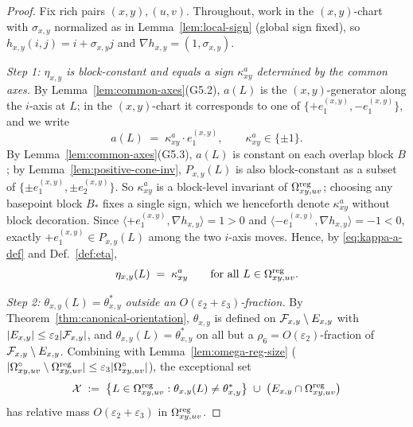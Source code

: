 \begin{proof}
Fix rich pairs $(x,y),(u,v)$. Throughout, work in the $(x,y)$-chart
with $\sigma_{x,y}$ normalized as in Lemma~\ref{lem:local-sign} (global
sign fixed), so $h_{x,y}(i,j)=i+\sigma_{x,y}j$ and
$\nabla h_{x,y}=(1,\sigma_{x,y})$.

\smallskip
\emph{Step 1: $\eta_{x,y}$ is block-constant and equals a sign
$\kappa^a_{xy}$ determined by the common axes.}
By Lemma~\ref{lem:common-axes}(G5.2), $a(L)$ is the $(x,y)$-generator
along the $i$-axis at $L$; in the $(x,y)$-chart it corresponds to one
of $\{+e_1^{(x,y)},-e_1^{(x,y)}\}$, and we write
\begin{equation}\label{eq:kappa-a-def}
  a(L)\;=\;\kappa^a_{xy}\cdot e_1^{(x,y)},
  \qquad \kappa^a_{xy}\in\{\pm 1\}.
\end{equation}
By Lemma~\ref{lem:common-axes}(G5.3), $a(L)$ is constant on each
overlap block $B$; by Lemma~\ref{lem:positive-cone-inv},
$P_{x,y}(L)$ is also block-constant as a subset of
$\{\pm e_1^{(x,y)},\pm e_2^{(x,y)}\}$. So $\kappa^a_{xy}$ is a
block-level invariant of $\Omega^{\mathrm{reg}}_{xy,uv}$; choosing any
basepoint block $B_\ast$ fixes a single sign, which we henceforth
denote $\kappa^a_{xy}$ without block decoration. Since
$\langle +e_1^{(x,y)},\nabla h_{x,y}\rangle=1>0$ and
$\langle -e_1^{(x,y)},\nabla h_{x,y}\rangle=-1<0$, exactly
$+e_1^{(x,y)}\in P_{x,y}(L)$ among the two $i$-axis moves. Hence, by
\eqref{eq:kappa-a-def} and Def.~\ref{def:eta},
\begin{equation}\label{eq:eta-eq-kappa}
  \eta_{x,y}(L)\;=\;\kappa^a_{xy}
  \qquad\text{for all }L\in\Omega^{\mathrm{reg}}_{xy,uv}.
\end{equation}

\smallskip
\emph{Step 2: $\theta_{x,y}(L)=\theta^\ast_{x,y}$ outside an
$O(\varepsilon_2+\varepsilon_3)$-fraction.}
By Theorem~\ref{thm:canonical-orientation}, $\theta_{x,y}$ is defined
on $\mathcal{F}_{x,y}\setminus E_{x,y}$ with
$|E_{x,y}|\le\varepsilon_2|\mathcal{F}_{x,y}|$, and $\theta_{x,y}(L)=\theta^\ast_{x,y}$
on all but a $\rho_6=O(\varepsilon_2)$-fraction of
$\mathcal{F}_{x,y}\setminus E_{x,y}$. Combining with Lemma~\ref{lem:omega-reg-size}
($|\Omega^\circ_{xy,uv}\setminus\Omega^{\mathrm{reg}}_{xy,uv}|\le\varepsilon_3
|\Omega^\circ_{xy,uv}|$), the exceptional set
\[
  \mathcal{X}\;:=\;
  \bigl\{L\in\Omega^{\mathrm{reg}}_{xy,uv}:\theta_{x,y}(L)\ne\theta^\ast_{x,y}\bigr\}
  \;\cup\;
  \bigl(E_{x,y}\cap\Omega^{\mathrm{reg}}_{xy,uv}\bigr)
\]
has relative mass $O(\varepsilon_2+\varepsilon_3)$ in
$\Omega^{\mathrm{reg}}_{xy,uv}$.


\end{proof}
